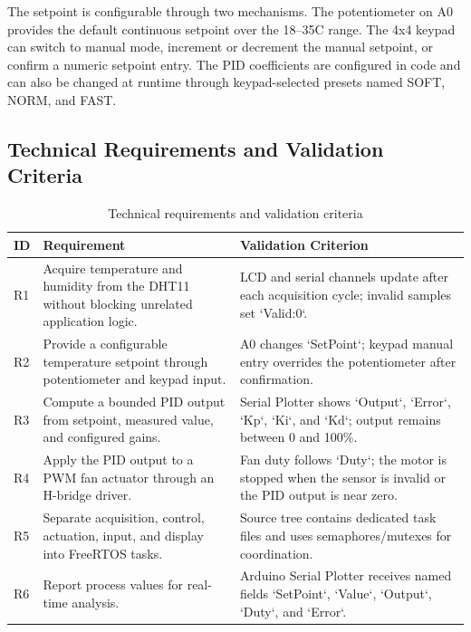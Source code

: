 The setpoint is configurable through two mechanisms. The potentiometer on A0 provides the default continuous setpoint over the 18--35\textdegree C range. The 4x4 keypad can switch to manual mode, increment or decrement the manual setpoint, or confirm a numeric setpoint entry. The PID coefficients are configured in code and can also be changed at runtime through keypad-selected presets named SOFT, NORM, and FAST.

\subsection{Technical Requirements and Validation Criteria}

\begin{table}[H]
\centering
\begin{tabular}{|p{1.0cm}|p{7.2cm}|p{5.4cm}|}
\hline
\textbf{ID} & \textbf{Requirement} & \textbf{Validation Criterion} \\
\hline
R1 & Acquire temperature and humidity from the DHT11 without blocking unrelated application logic. & LCD and serial channels update after each acquisition cycle; invalid samples set `Valid:0`. \\
\hline
R2 & Provide a configurable temperature setpoint through potentiometer and keypad input. & A0 changes `SetPoint`; keypad manual entry overrides the potentiometer after confirmation. \\
\hline
R3 & Compute a bounded PID output from setpoint, measured value, and configured gains. & Serial Plotter shows `Output`, `Error`, `Kp`, `Ki`, and `Kd`; output remains between 0 and 100\%. \\
\hline
R4 & Apply the PID output to a PWM fan actuator through an H-bridge driver. & Fan duty follows `Duty`; the motor is stopped when the sensor is invalid or the PID output is near zero. \\
\hline
R5 & Separate acquisition, control, actuation, input, and display into FreeRTOS tasks. & Source tree contains dedicated task files and uses semaphores/mutexes for coordination. \\
\hline
R6 & Report process values for real-time analysis. & Arduino Serial Plotter receives named fields `SetPoint`, `Value`, `Output`, `Duty`, and `Error`. \\
\hline
\end{tabular}
\caption{Technical requirements and validation criteria}
\label{tab:requirements_validation}
\end{table}

